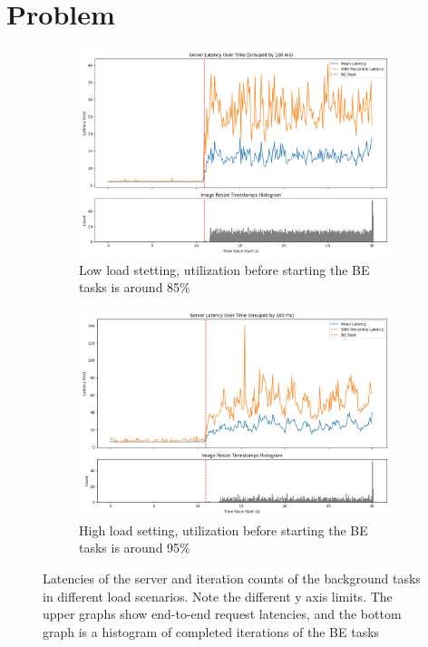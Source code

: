 \section{Problem}\label{s:problem}


\begin{figure}[t]
    \centering
    \begin{subfigure}[b]{0.49\columnwidth}
        \includegraphics[width=\columnwidth]{graphs/srv-bg-unedited-low.png}
        \caption{Low load stetting, utilization before starting the BE tasks is
        around 85\%}\label{fig:srv-bg-unedited-low}
    \end{subfigure}
    \hspace{\fill}
    \begin{subfigure}[b]{0.49\columnwidth}
        \includegraphics[width=\columnwidth]{graphs/srv-bg-unedited-high.png}
        \caption{High load setting, utilization before starting the BE tasks is
        around 95\%}\label{fig:srv-bg-unedited-high}
    \end{subfigure}
    \vspace{4pt}
    \caption{Latencies of the server and iteration counts of the background
    tasks in different load scenarios. Note the different y axis limits. The
    upper graphs show end-to-end request latencies, and the bottom graph is a
    histogram of completed iterations of the BE tasks}\label{fig:srv-bg-unedited}
\end{figure}

